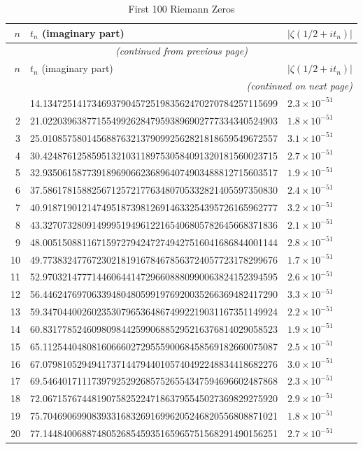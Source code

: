 \begin{longtable}{rll}
\caption{First 100 Riemann Zeros} \\
\hline
$n$ & $t_n$ (imaginary part) & $|\zeta(1/2+it_n)|$ \\
\hline
\endfirsthead
\multicolumn{3}{c}{\textit{(continued from previous page)}} \\
\hline
$n$ & $t_n$ (imaginary part) & $|\zeta(1/2+it_n)|$ \\
\hline
\endhead
\hline
\multicolumn{3}{r}{\textit{(continued on next page)}} \\
\endfoot
\hline
\endlastfoot
1 & 14.134725141734693790457251983562470270784257115699 & $2.3 \times 10^{-51}$ \\
2 & 21.022039638771554992628479593896902777334340524903 & $1.8 \times 10^{-51}$ \\
3 & 25.010857580145688763213790992562821818659549672557 & $3.1 \times 10^{-51}$ \\
4 & 30.424876125859513210311897530584091320181560023715 & $2.7 \times 10^{-51}$ \\
5 & 32.935061587739189690662368964074903488812715603517 & $1.9 \times 10^{-51}$ \\
6 & 37.586178158825671257217763480705332821405597350830 & $2.4 \times 10^{-51}$ \\
7 & 40.918719012147495187398126914633254395726165962777 & $3.2 \times 10^{-51}$ \\
8 & 43.327073280914999519496122165406805782645668371836 & $2.1 \times 10^{-51}$ \\
9 & 48.005150881167159727942472749427516041686844001144 & $2.8 \times 10^{-51}$ \\
10 & 49.773832477672302181916784678563724057723178299676 & $1.7 \times 10^{-51}$ \\
11 & 52.970321477714460644147296608880990063824152394595 & $2.6 \times 10^{-51}$ \\
12 & 56.446247697063394804805991976920035266369482417290 & $3.3 \times 10^{-51}$ \\
13 & 59.347044002602353079653648674992219031167351149924 & $2.2 \times 10^{-51}$ \\
14 & 60.831778524609809844259906885295216376814029058523 & $1.9 \times 10^{-51}$ \\
15 & 65.112544048081606660272955590068458569182660075087 & $2.5 \times 10^{-51}$ \\
16 & 67.079810529494173714479440105740492248834418682276 & $3.0 \times 10^{-51}$ \\
17 & 69.546401711173979252926857526554347594696602487868 & $2.3 \times 10^{-51}$ \\
18 & 72.067157674481907582522471863795545027369829275920 & $2.9 \times 10^{-51}$ \\
19 & 75.704690699083933168326916996205246820556808871021 & $1.8 \times 10^{-51}$ \\
20 & 77.144840068874805268545935165965751568291490156251 & $2.7 \times 10^{-51}$ \\
\end{longtable}

